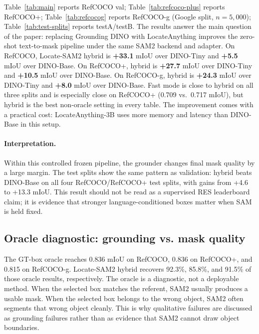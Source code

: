 \documentclass[11pt,a4paper]{article}
\begin{document}
Table~\ref{tab:main} reports RefCOCO val; Table~\ref{tab:refcoco-plus} reports RefCOCO+; Table~\ref{tab:refcocog} reports RefCOCO-g (Google split, $n{=}5{,}000$); Table~\ref{tab:test-splits} reports testA/testB.
The results answer the main question of the paper: replacing Grounding DINO with LocateAnything improves the zero-shot text-to-mask pipeline under the same SAM2 backend and adapter.
On RefCOCO, Locate-SAM2 hybrid is \textbf{+33.1} mIoU over DINO-Tiny and \textbf{+5.5} mIoU over DINO-Base.
On RefCOCO+, hybrid is \textbf{+27.7} mIoU over DINO-Tiny and \textbf{+10.5} mIoU over DINO-Base.
On RefCOCO-g, hybrid is \textbf{+24.3} mIoU over DINO-Tiny and \textbf{+8.0} mIoU over DINO-Base.
Fast mode is close to hybrid on all three splits and is especially close on RefCOCO+ (0.709 vs.\ 0.717 mIoU), but hybrid is the best non-oracle setting in every table.
The improvement comes with a practical cost: LocateAnything-3B uses more memory and latency than DINO-Base in this setup.

\paragraph{Interpretation.}
Within this controlled frozen pipeline, the grounder changes final mask quality by a large margin.
The test splits show the same pattern as validation: hybrid beats DINO-Base on all four RefCOCO/RefCOCO+ test splits, with gains from +4.6 to +13.3 mIoU.
This result should not be read as a supervised RES leaderboard claim; it is evidence that stronger language-conditioned boxes matter when SAM is held fixed.




\subsection{Oracle diagnostic: grounding vs. mask quality}
\label{sec:oracle}

The GT-box oracle reaches 0.836 mIoU on RefCOCO, 0.836 on RefCOCO+, and 0.815 on RefCOCO-g.
Locate-SAM2 hybrid recovers 92.3\%, 85.8\%, and 91.5\% of those oracle results, respectively.
The oracle is a diagnostic, not a deployable method.
When the selected box matches the referent, SAM2 usually produces a usable mask.
When the selected box belongs to the wrong object, SAM2 often segments that wrong object cleanly.
This is why qualitative failures are discussed as grounding failures rather than as evidence that SAM2 cannot draw object boundaries.
\end{document}
